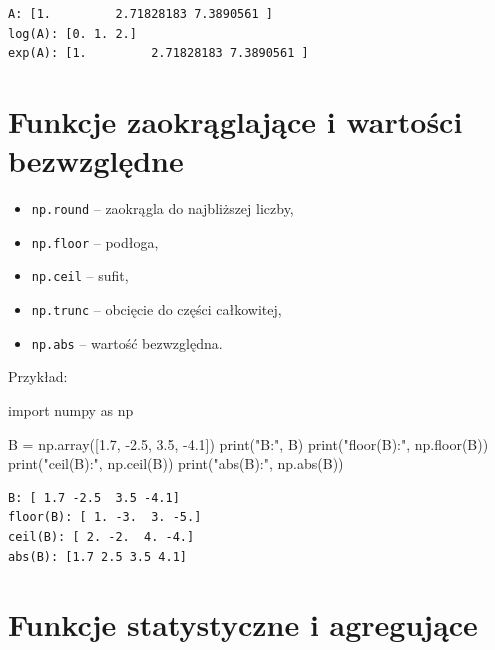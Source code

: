 \documentclass[
  letterpaper,
  DIV=11,
  numbers=noendperiod]{scrreprt}
\newenvironment{Shaded}{\begin{snugshade}}{\end{snugshade}}
\newcommand{\BuiltInTok}[1]{\textcolor[rgb]{0.00,0.23,0.31}{#1}}
\newcommand{\FloatTok}[1]{\textcolor[rgb]{0.68,0.00,0.00}{#1}}
\newcommand{\ImportTok}[1]{\textcolor[rgb]{0.00,0.46,0.62}{#1}}
\newcommand{\NormalTok}[1]{\textcolor[rgb]{0.00,0.23,0.31}{#1}}
\newcommand{\OperatorTok}[1]{\textcolor[rgb]{0.37,0.37,0.37}{#1}}
\newcommand{\StringTok}[1]{\textcolor[rgb]{0.13,0.47,0.30}{#1}}
\providecommand{\tightlist}{%
  \setlength{\itemsep}{0pt}\setlength{\parskip}{0pt}}\usepackage{longtable,booktabs,array}
\begin{document}
\begin{verbatim}
A: [1.         2.71828183 7.3890561 ]
log(A): [0. 1. 2.]
exp(A): [1.         2.71828183 7.3890561 ]
\end{verbatim}

\section{Funkcje zaokrąglające i wartości
bezwzględne}\label{funkcje-zaokrux105glajux105ce-i-wartoux15bci-bezwzglux119dne}

\begin{itemize}
\tightlist
\item
  \texttt{np.round} -- zaokrągla do najbliższej liczby,
\item
  \texttt{np.floor} -- podłoga,
\item
  \texttt{np.ceil} -- sufit,
\item
  \texttt{np.trunc} -- obcięcie do części całkowitej,
\item
  \texttt{np.abs} -- wartość bezwzględna.
\end{itemize}

Przykład:

\begin{Shaded}
\begin{Highlighting}[]
\ImportTok{import}\NormalTok{ numpy }\ImportTok{as}\NormalTok{ np}

\NormalTok{B }\OperatorTok{=}\NormalTok{ np.array([}\FloatTok{1.7}\NormalTok{, }\OperatorTok{{-}}\FloatTok{2.5}\NormalTok{, }\FloatTok{3.5}\NormalTok{, }\OperatorTok{{-}}\FloatTok{4.1}\NormalTok{])}
\BuiltInTok{print}\NormalTok{(}\StringTok{"B:"}\NormalTok{, B)}
\BuiltInTok{print}\NormalTok{(}\StringTok{"floor(B):"}\NormalTok{, np.floor(B))}
\BuiltInTok{print}\NormalTok{(}\StringTok{"ceil(B):"}\NormalTok{, np.ceil(B))}
\BuiltInTok{print}\NormalTok{(}\StringTok{"abs(B):"}\NormalTok{, np.}\BuiltInTok{abs}\NormalTok{(B))}
\end{Highlighting}
\end{Shaded}

\begin{verbatim}
B: [ 1.7 -2.5  3.5 -4.1]
floor(B): [ 1. -3.  3. -5.]
ceil(B): [ 2. -2.  4. -4.]
abs(B): [1.7 2.5 3.5 4.1]
\end{verbatim}

\section{Funkcje statystyczne i
agregujące}\label{funkcje-statystyczne-i-agregujux105ce}
\end{document}
